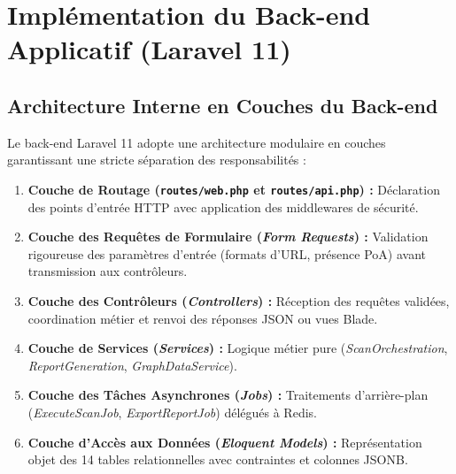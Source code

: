 \section{Impl\'ementation du Back-end Applicatif (Laravel 11)}
\subsection{Architecture Interne en Couches du Back-end}
\par Le back-end Laravel 11 adopte une architecture modulaire en couches garantissant une stricte s\'eparation des responsabilit\'es :
\begin{enumerate}
    \item \textbf{Couche de Routage (\texttt{routes/web.php} et \texttt{routes/api.php}) :} D\'eclaration des points d'entr\'ee HTTP avec application des middlewares de s\'ecurit\'e.
    \item \textbf{Couche des Requ\^etes de Formulaire (\textit{Form Requests}) :} Validation rigoureuse des param\`etres d'entr\'ee (formats d'URL, pr\'esence PoA) avant transmission aux contr\^oleurs.
    \item \textbf{Couche des Contr\^oleurs (\textit{Controllers}) :} R\'eception des requ\^etes valid\'ees, coordination m\'etier et renvoi des r\'eponses JSON ou vues Blade.
    \item \textbf{Couche de Services (\textit{Services}) :} Logique m\'etier pure (\textit{ScanOrchestration}, \textit{ReportGeneration}, \textit{GraphDataService}).
    \item \textbf{Couche des T\^aches Asynchrones (\textit{Jobs}) :} Traitements d'arri\`ere-plan (\textit{ExecuteScanJob}, \textit{ExportReportJob}) d\'el\'egu\'es \`a Redis.
    \item \textbf{Couche d'Acc\`es aux Donn\'ees (\textit{Eloquent Models}) :} Repr\'esentation objet des 14 tables relationnelles avec contraintes et colonnes JSONB.
\end{enumerate}

